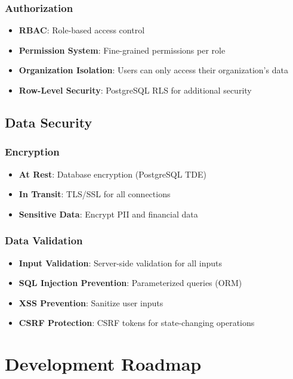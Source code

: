 \documentclass[11pt,a4paper]{article}
\begin{document}
\subsubsection{Authorization}
\begin{itemize}
    \item \textbf{RBAC}: Role-based access control
    \item \textbf{Permission System}: Fine-grained permissions per role
    \item \textbf{Organization Isolation}: Users can only access their organization's data
    \item \textbf{Row-Level Security}: PostgreSQL RLS for additional security
\end{itemize}

\subsection{Data Security}

\subsubsection{Encryption}
\begin{itemize}
    \item \textbf{At Rest}: Database encryption (PostgreSQL TDE)
    \item \textbf{In Transit}: TLS/SSL for all connections
    \item \textbf{Sensitive Data}: Encrypt PII and financial data
\end{itemize}

\subsubsection{Data Validation}
\begin{itemize}
    \item \textbf{Input Validation}: Server-side validation for all inputs
    \item \textbf{SQL Injection Prevention}: Parameterized queries (ORM)
    \item \textbf{XSS Prevention}: Sanitize user inputs
    \item \textbf{CSRF Protection}: CSRF tokens for state-changing operations
\end{itemize}

\section{Development Roadmap}
\end{document}
